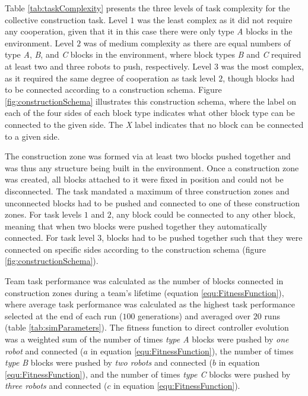 \documentclass[conference]{IEEEtran}
\begin{document}
Table \ref{tab:taskComplexity} presents the three levels of task complexity for the
collective construction task.  Level $1$ was the least complex as it did not require
any cooperation, given that it in this case there were only type \textit{A}
blocks in the environment.
Level $2$ was of medium complexity as there are equal numbers of type \textit{A},
\textit{B}, and \textit{C} blocks in the environment, where block types \textit{B} and \textit{C} required
at least two and three robots to push, respectively.
Level $3$ was the most complex, as it required the same degree of cooperation as task level
$2$, though blocks had to be connected according to a construction schema.
Figure \ref{fig:constructionSchema}
illustrates this construction schema, where the label on each of the
four sides of each block type indicates what other block type can be connected to the given side.
The \textit{X} label indicates that no block can be connected to a given side.

The construction zone was formed via at least two blocks pushed together and
was thus any structure being built in the environment.
Once a construction zone was created, all blocks attached to it were fixed in position
and could not be disconnected.
The task mandated a maximum of three construction zones and unconnected blocks
had to be pushed and connected to one of these construction zones.
For task levels $1$ and $2$, any block could be connected to any other block,
meaning that when two blocks were pushed
together they automatically connected.
For task level $3$, blocks had to be pushed together such
that they were connected on specific sides according to the construction schema
(figure \ref{fig:constructionSchema}).

Team task performance was calculated as the number of blocks connected in construction zones
during a team's lifetime (equation \ref{equ:FitnessFunction}),
where average task performance was calculated as the highest task
performance selected at the end of each run ($100$ generations) and averaged over $20$ runs
(table \ref{tab:simParameters}).
The fitness function to direct controller evolution was a weighted sum of
the number of times \textit{type A} blocks were pushed by \textit{one robot}
and connected (\(a\) in equation \ref{equ:FitnessFunction}), the number of times \textit{type B} blocks were pushed
by \textit{two robots} and connected (\(b\) in equation \ref{equ:FitnessFunction}),
and the number of times \textit{type C} blocks were pushed by \textit{three robots}
and connected (\(c\) in equation \ref{equ:FitnessFunction}).
\end{document}
